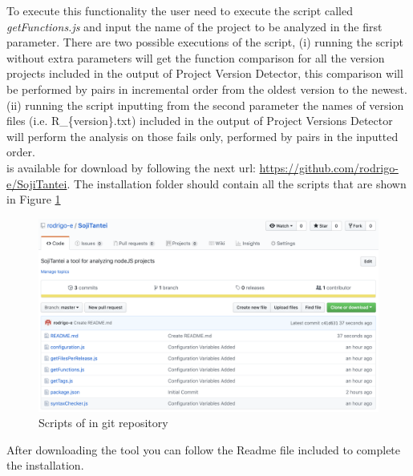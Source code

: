 To execute this functionality the user need to execute the script called \textit{getFunctions.js} and input the name of the project to be analyzed in the first parameter.
There are two possible executions of the script,
(i) running the script without extra parameters will get the function comparison for all the version projects included in the output of Project Version Detector, this comparison will be performed by pairs in incremental order from the oldest version to the newest.
(ii) running the script inputting from the second parameter the names of version files (i.e. R\_\{version\}.txt) included in the output of Project Versions Detector will perform the analysis on those fails only, performed by pairs in the inputted order.\\

\tool[] is available for download by following the next url: \url{https://github.com/rodrigo-e/SojiTantei}.
The installation folder should contain all the scripts that are shown in Figure \ref{fig:sojiGit}

\begin{figure}[ht!]
\centering
\includegraphics[width=1\textwidth]{images/soji_git.png}
\caption{Scripts of \tool[] in git repository}
\label{fig:sojiGit}
\end{figure}

After downloading the tool you can follow the Readme file included to complete the installation.

